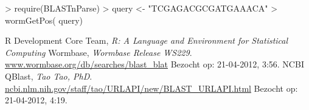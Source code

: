 \documentclass[a4paper]{article}
\begin{document}
\begin{Schunk}
\begin{Sinput}
> require(BLASTnParse)
> query <- "TCGAGACGCGATGAAACA"
> wormGetPos( query)
\end{Sinput}
\end{Schunk}

\renewcommand{\refname}{Referenties}
\begin{thebibliography}{9}
    R Development Core Team, \emph{R: A Language and Environment for Statistical Computing}
    Wormbase, \emph{Wormbase Release WS229}. \url{www.wormbase.org/db/searches/blast_blat} Bezocht op: 21-04-2012, 3:56.
    NCBI QBlast, \emph{Tao Tao, PhD}. \url{ncbi.nlm.nih.gov/staff/tao/URLAPI/new/BLAST_URLAPI.html} Bezocht op: 21-04-2012, 4:19.
\end{thebibliography}
\end{document}
